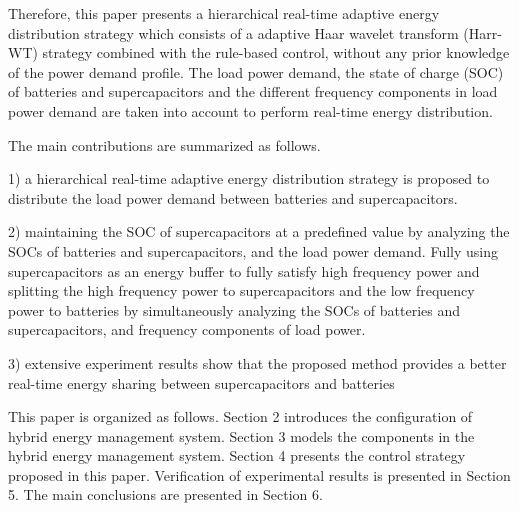 \documentclass[energies,article,submit,moreauthors,pdftex,10pt,a4paper]{Definitions/mdpi}
\begin{document}
Therefore, this paper presents a hierarchical real-time adaptive energy distribution strategy which consists of a adaptive Haar wavelet transform (Harr-WT) strategy combined with the rule-based control, without any prior knowledge of the power demand profile. The load power demand, the state of charge (SOC) of batteries and supercapacitors and the different frequency components in load power demand are taken into account to perform real-time energy distribution.

The main contributions are summarized as follows.

1) a hierarchical real-time adaptive energy distribution strategy is proposed to distribute the load power demand between batteries and supercapacitors.

2) maintaining the SOC of supercapacitors at a predefined value by analyzing the SOCs of batteries and supercapacitors, and the load power demand. Fully using supercapacitors as an energy buffer to fully satisfy high frequency power and splitting the high frequency power to supercapacitors and the low frequency power to batteries by simultaneously analyzing the SOCs of batteries and supercapacitors, and frequency components of load power.

3)  extensive experiment results show that the proposed method provides a better real-time energy sharing between supercapacitors and batteries
%

This paper is organized as follows. Section 2 introduces the configuration of hybrid energy management system. Section 3 models the components in the hybrid energy management system. Section 4 presents the control strategy proposed in this paper. Verification of experimental results is presented in Section 5. The main conclusions are presented in Section 6.
\end{document}
